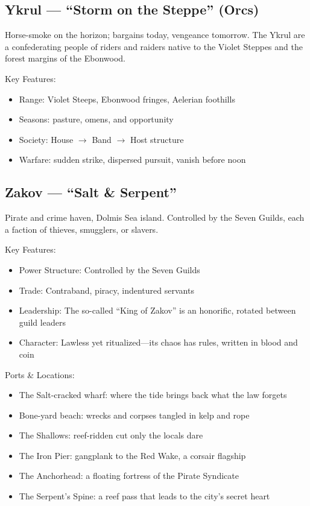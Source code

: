\subsection{Ykrul --- ``Storm on the Steppe'' (Orcs)}
\label{sec:ykrul}

Horse-smoke on the horizon; bargains today, vengeance tomorrow. The Ykrul are a confederating people of riders and raiders native to the Violet Steppes and the forest margins of the Ebonwood.

Key Features:
\begin{itemize}
    \item Range: Violet Steeps, Ebonwood fringes, Aelerian foothills
    \item Seasons: pasture, omens, and opportunity
    \item Society: House $\rightarrow$ Band $\rightarrow$ Host structure
    \item Warfare: sudden strike, dispersed pursuit, vanish before noon
\end{itemize}

\subsection{Zakov --- ``Salt \& Serpent''}
\label{sec:zakov}

Pirate and crime haven, Dolmis Sea island. Controlled by the Seven Guilds, each a faction of thieves, smugglers, or slavers.

Key Features:
\begin{itemize}
    \item Power Structure: Controlled by the Seven Guilds
    \item Trade: Contraband, piracy, indentured servants
    \item Leadership: The so-called ``King of Zakov'' is an honorific, rotated between guild leaders
    \item Character: Lawless yet ritualized---its chaos has rules, written in blood and coin
\end{itemize}

Ports \& Locations:
\begin{itemize}
    \item The Salt-cracked wharf: where the tide brings back what the law forgets
    \item Bone-yard beach: wrecks and corpses tangled in kelp and rope
    \item The Shallows: reef-ridden cut only the locals dare
    \item The Iron Pier: gangplank to the Red Wake, a corsair flagship
    \item The Anchorhead: a floating fortress of the Pirate Syndicate
    \item The Serpent's Spine: a reef pass that leads to the city's secret heart
\end{itemize}

